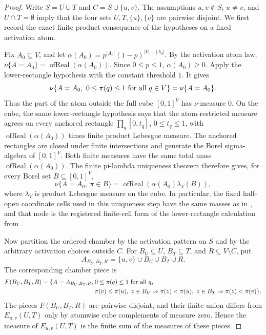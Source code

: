 \begin{proof}
Write \(S=U\cup T\) and \(C=S\cup\{u,v\}\).  The assumptions
\(u,v\notin S\), \(u\ne v\), and \(U\cap T=\emptyset\) imply that the four
sets \(U,T,\{u\},\{v\}\) are pairwise disjoint.  We first record the exact
finite product consequence of the hypotheses on a fixed activation atom.

Fix \(A_0\subseteq V\), and let \(\alpha(A_0)=
p^{|A_0|}(1-p)^{|V|-|A_0|}\).  By the activation atom law,
\(\nu\{A=A_0\}=\operatorname{ofReal}(\alpha(A_0))\).  Since \(0\le p\le1\),
\(\alpha(A_0)\ge0\).  Apply the lower-rectangle hypothesis with the constant
threshold \(1\).  It gives
\[
\nu\{A=A_0,\ 0\le \pi(q)\le1\hbox{ for all }q\in V\}
=\nu\{A=A_0\}.
\]
Thus the part of the atom outside the full cube \([0,1]^V\) has
\(\nu\)-measure \(0\).  On the cube, the same lower-rectangle hypothesis says
that the atom-restricted measure agrees on every anchored rectangle
\(\prod_q[0,t_q]\), \(0\le t_q\le1\), with
\(\operatorname{ofReal}(\alpha(A_0))\) times finite product Lebesgue measure.
The anchored rectangles are closed under finite intersections and generate
the Borel sigma-algebra of \([0,1]^V\).  Both finite measures have the same
total mass \(\operatorname{ofReal}(\alpha(A_0))\).  The finite
pi-lambda uniqueness theorem therefore gives, for every Borel set
\(B\subseteq[0,1]^V\),
\[
\nu\{A=A_0,\ \pi\in B\}
=\operatorname{ofReal}(\alpha(A_0)\lambda_V(B)),
\tag{1}
\]
where \(\lambda_V\) is product Lebesgue measure on the cube.  In particular,
the fixed half-open coordinate cells used in this uniqueness step have the
same masses as in , and that
node is the registered finite-cell form of the lower-rectangle calculation
from .

Now partition the ordered chamber by the activation pattern on \(S\) and by
the arbitrary activation choices outside \(C\).  For \(B_U\subseteq U\),
\(B_T\subseteq T\), and \(R\subseteq V\setminus C\), put
\[
A_{B_U,B_T,R}=\{u,v\}\cup B_U\cup B_T\cup R .
\]
The corresponding chamber piece is
\[
\begin{aligned}
F(B_U,B_T,R)=\{A=A_{B_U,B_T,R},\;&0\le\pi(q)\le1\hbox{ for all }q,\\
&\pi(v)\le\pi(u),\
z\in B_U\Rightarrow \pi(z)<\pi(u),\
z\in B_T\Rightarrow \pi(z)<\pi(v)\}.
\end{aligned}
\]
The pieces \(F(B_U,B_T,R)\) are pairwise disjoint, and their finite union
differs from \(E_{u,v}(U,T)\) only by atomwise cube complements of measure
zero.  Hence the measure of \(E_{u,v}(U,T)\) is the finite sum of the measures
of these pieces.


\end{proof}
